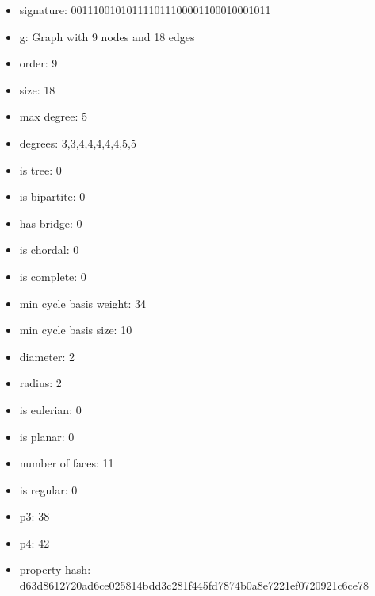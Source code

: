 \newpage
\begin{figure}
\end{figure}
\begin{itemize}
\item signature: 001110010101111011100001100010001011
\item g: Graph with 9 nodes and 18 edges
\item order: 9
\item size: 18
\item max degree: 5
\item degrees: 3,3,4,4,4,4,4,5,5
\item is tree: 0
\item is bipartite: 0
\item has bridge: 0
\item is chordal: 0
\item is complete: 0
\item min cycle basis weight: 34
\item min cycle basis size: 10
\item diameter: 2
\item radius: 2
\item is eulerian: 0
\item is planar: 0
\item number of faces: 11
\item is regular: 0
\item p3: 38
\item p4: 42
\item property hash: d63d8612720ad6ce025814bdd3c281f445fd7874b0a8e7221ef0720921c6ce78
\end{itemize}

